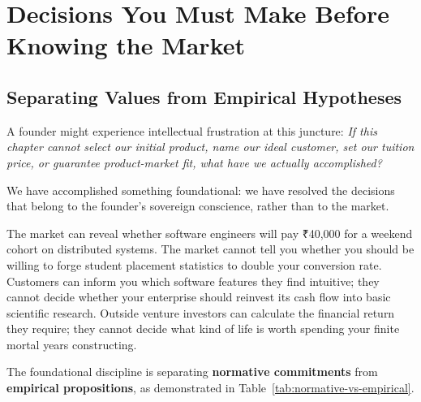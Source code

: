 \section{Decisions You Must Make Before Knowing the Market}

\subsection{Separating Values from Empirical Hypotheses}

A founder might experience intellectual frustration at this juncture: \textit{If this chapter cannot select our initial product, name our ideal customer, set our tuition price, or guarantee product-market fit, what have we actually accomplished?}

We have accomplished something foundational: we have resolved the decisions that belong to the founder's sovereign conscience, rather than to the market.

The market can reveal whether software engineers will pay ₹40,000 for a weekend cohort on distributed systems. The market cannot tell you whether you should be willing to forge student placement statistics to double your conversion rate. Customers can inform you which software features they find intuitive; they cannot decide whether your enterprise should reinvest its cash flow into basic scientific research. Outside venture investors can calculate the financial return they require; they cannot decide what kind of life is worth spending your finite mortal years constructing.

The foundational discipline is separating \textbf{normative commitments} from \textbf{empirical propositions}, as demonstrated in Table~\ref{tab:normative-vs-empirical}.

